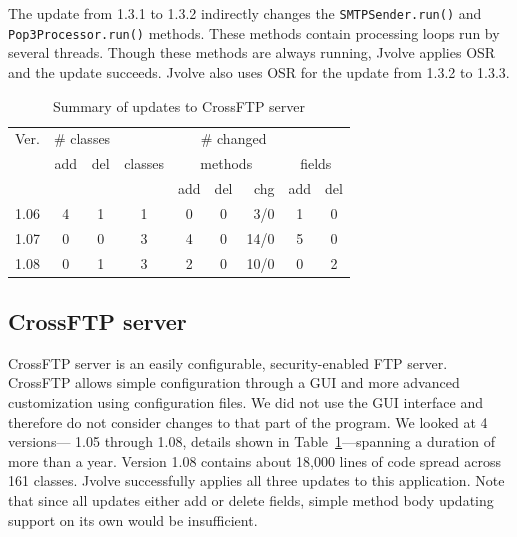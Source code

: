 \documentclass[9pt]{sigplanconf}
\newcommand{\DSU}{{\sc Jvolve}}
\newcommand\T{\rule{0pt}{2.0ex}}
\begin{document}
The update from 1.3.1 to 1.3.2 indirectly changes the
\texttt{SMTP\-Sen\-d\-er.run()} and \texttt{Pop3\-Processor.run()} methods.  These
methods contain processing loops run by several threads.  Though these
methods are always running, \DSU{} applies OSR and the update succeeds.
\DSU{} also uses OSR for the update from 1.3.2 to 1.3.3.
\begin{table}[t]
\begin{footnotesize}
\begin{center}
\begin{tabular}{|l||c|c||c|c|c|r|c|c|} \hline \T
Ver.   & \multicolumn{2}{c||}{\# classes} &    \multicolumn{6}{c|}{\# changed}             \\
       & add & del & classes & \multicolumn{3}{c|}{methods} & \multicolumn{2}{c|}{fields}  \\
       &     &     &         & add & del & chg   & add & del                               \\ \hline \hline \T
1.06   & 4   & 1   & 1       & 0   & 0   & 3/0   & 1   & 0                                 \\
1.07   & 0   & 0   & 3       & 4   & 0   & 14/0  & 5   & 0                                 \\
1.08   & 0   & 1   & 3       & 2   & 0   & 10/0  & 0   & 2                                 \\ \hline
\end{tabular}
\end{center}
\end{footnotesize}
\caption{Summary of updates to CrossFTP server}
\label{tab:crossftp-changes}
\end{table}

\subsection{CrossFTP server}
\label{subsec:crossftp}
CrossFTP server is an easily configurable, security-enabled FTP server.
CrossFTP allows simple configuration through a GUI and more advanced
customization using configuration files. We did not use the GUI interface
and therefore do not consider changes to that part of the program.  We
looked at 4 versions--- 1.05 through 1.08, details shown in Table~\ref{tab:crossftp-changes}---spanning a duration of more
than a year. Version 1.08 contains about 18,000 lines of code spread across
161 classes. \DSU{} successfully applies all three updates to this
application.  Note that since all updates either add or delete fields,
simple method body updating support on its own would be insufficient.
\end{document}
